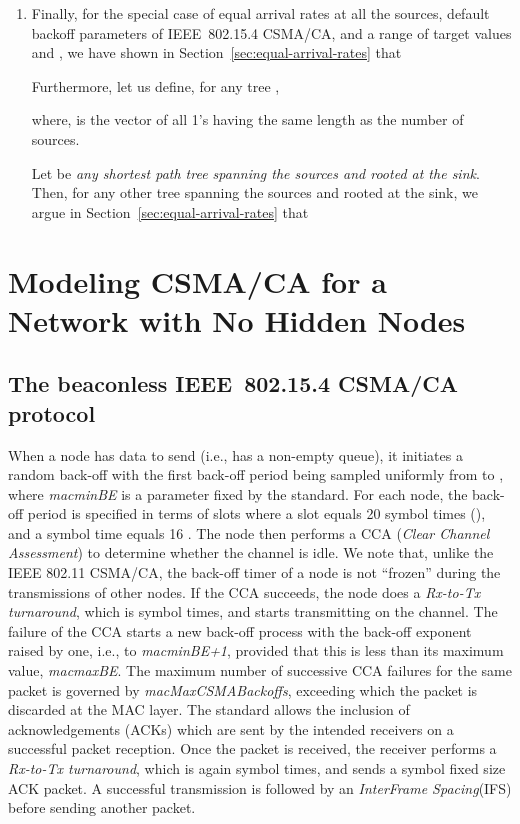 \documentclass[12pt, draftclsnofoot, onecolumn]{IEEEtran}
\begin{document}
\begin{enumerate}
\item Finally, for the special case of equal arrival rates at all the sources, default backoff parameters of IEEE~802.15.4 CSMA/CA, and a range of target values  and , we have shown in Section~\ref{sec:equal-arrival-rates} that 


Furthermore, let us define, for any tree ,

where,  is the vector of all 1's having the same length as the number of sources. 

Let  be \emph{any shortest path tree spanning the sources and rooted at the sink}. Then, for any other tree  spanning the sources and rooted at the sink, we argue in Section~\ref{sec:equal-arrival-rates} that

\end{enumerate}

\section{Modeling CSMA/CA for a Network with No Hidden Nodes}
\subsection{The beaconless IEEE~802.15.4 CSMA/CA protocol\cite{srivastava}}
\label{subsec:csma-description}
When a node has data to send (i.e., has a non-empty queue), it initiates a random back-off with the first back-off period being sampled uniformly from  to \emph{}, where \emph{macminBE} is a parameter fixed by the standard. For each node, the back-off period is specified in terms of slots where a slot equals 20 symbol times (), and a symbol time equals 16 . The node then performs a CCA (\emph{Clear Channel Assessment}) to determine whether the channel is idle. We note that, unlike the IEEE 802.11 CSMA/CA, the back-off timer of a node is not ``frozen'' during the transmissions of other nodes. If the CCA succeeds, the node does a \emph{Rx-to-Tx turnaround}, which is  symbol times, and starts transmitting on the channel. The failure of the CCA starts a new back-off process with the back-off exponent raised by one, i.e., to \emph{macminBE+1}, provided that this is less than its maximum value, \emph{macmaxBE}. The maximum number of successive CCA failures for the same packet is governed by \emph{macMaxCSMABackoffs}, exceeding which the packet is discarded at the MAC layer. The standard allows the inclusion of acknowledgements (ACKs) which are sent by the intended receivers on a successful packet reception. Once the packet is received, the receiver performs a \emph{Rx-to-Tx turnaround}, which is again  symbol times, and sends a  symbol fixed size ACK packet. A successful transmission is followed by an \emph{InterFrame Spacing}(IFS) before sending another packet.
\end{document}
